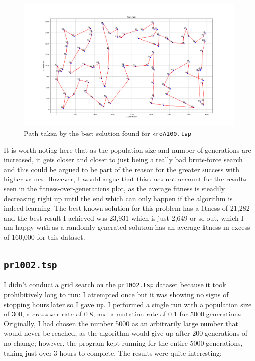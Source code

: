 \documentclass[a4paper]{article}
\begin{document}
\begin{figure}[H]
    \centering
    \includegraphics[width=\textwidth]{./images/beterkroapath.png}
    \caption{Path taken by the best solution found for \texttt{kroA100.tsp}}
\end{figure}

It is worth noting here that as the population size and number of generations are increased, it gets closer and closer to just being a really bad brute-force search and this could be argued to be part of the reason for the greater success with higher values.
However, I would argue that this does not account for the results seen in the fitness-over-generations plot, as the average fitness is steadily decreasing right up until the end which can only happen if the algorithm is indeed learning.
The best known solution for this problem has a fitness of 21,282 and the best result I achieved was 23,931 which is just 2,649 or so out, which I am happy with as a randomly generated solution has an average fitness in excess of 160,000 for this dataset.

\subsection{\texttt{pr1002.tsp}}
I didn't conduct a grid search on the \texttt{pr1002.tsp} dataset because it took prohibitively long to run:
I attempted once but it was showing no signs of stopping hours later so I gave up.
I performed a single run with a population size of 300, a crossover rate of 0.8, and a mutation rate of 0.1 for 5000 generations.
Originally, I had chosen the number 5000 as an arbitrarily large number that would never be reached, as the algorithm would give up after 200 generations of no change; 
however, the program kept running for the entire 5000 generations, taking just over 3 hours to complete.
The results were quite interesting:
\end{document}

